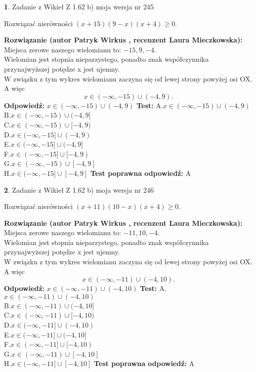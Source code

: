 \documentclass[12pt, a4paper]{article}
\theoremstyle{definition} %
\newtheorem{zad}{}
\newcommand{\zadStart}[1]{\begin{zad}#1\newline}
\newcommand{\zadStop}{\end{zad}}
\newcommand{\rozwStart}[2]{\noindent \textbf{Rozwiązanie (autor #1 , recenzent #2): }\newline}
\newcommand{\rozwStop}{\newline}
\newcommand{\odpStart}{\noindent \textbf{Odpowiedź:}\newline}
\newcommand{\odpStop}{\newline}
\newcommand{\testStart}{\noindent \textbf{Test:}\newline}
\newcommand{\testStop}{\newline}
\newcommand{\kluczStart}{\noindent \textbf{Test poprawna odpowiedź:}\newline}
\newcommand{\kluczStop}{\newline}
\begin{document}
\zadStart{Zadanie z Wikieł Z 1.62 b) moja wersja nr 245}

Rozwiązać nierówności $(x+15)(9-x)(x+4)\ge0$.
\zadStop
\rozwStart{Patryk Wirkus}{Laura Mieczkowska}
Miejsca zerowe naszego wielomianu to: $-15, 9, -4$.\\
Wielomian jest stopnia nieparzystego, ponadto znak współczynnika przy\linebreak najwyższej potędze x jest ujemny.\\ W związku z tym wykres wielomianu zaczyna się od lewej strony powyżej osi OX. A więc $$x \in (-\infty,-15) \cup (-4,9).$$
\rozwStop
\odpStart
$x \in (-\infty,-15) \cup (-4,9)$
\odpStop
\testStart
A.$x \in (-\infty,-15) \cup (-4,9)$\\
B.$x \in (-\infty,-15) \cup (-4,9]$\\
C.$x \in (-\infty,-15) \cup [-4,9)$\\
D.$x \in (-\infty,-15] \cup (-4,9)$\\
E.$x \in (-\infty,-15] \cup (-4,9]$\\
F.$x \in (-\infty,-15] \cup [-4,9)$\\
G.$x \in (-\infty,-15) \cup [-4,9]$\\
H.$x \in (-\infty,-15] \cup [-4,9]$
\testStop
\kluczStart
A
\kluczStop



\zadStart{Zadanie z Wikieł Z 1.62 b) moja wersja nr 246}

Rozwiązać nierówności $(x+11)(10-x)(x+4)\ge0$.
\zadStop
\rozwStart{Patryk Wirkus}{Laura Mieczkowska}
Miejsca zerowe naszego wielomianu to: $-11, 10, -4$.\\
Wielomian jest stopnia nieparzystego, ponadto znak współczynnika przy\linebreak najwyższej potędze x jest ujemny.\\ W związku z tym wykres wielomianu zaczyna się od lewej strony powyżej osi OX. A więc $$x \in (-\infty,-11) \cup (-4,10).$$
\rozwStop
\odpStart
$x \in (-\infty,-11) \cup (-4,10)$
\odpStop
\testStart
A.$x \in (-\infty,-11) \cup (-4,10)$\\
B.$x \in (-\infty,-11) \cup (-4,10]$\\
C.$x \in (-\infty,-11) \cup [-4,10)$\\
D.$x \in (-\infty,-11] \cup (-4,10)$\\
E.$x \in (-\infty,-11] \cup (-4,10]$\\
F.$x \in (-\infty,-11] \cup [-4,10)$\\
G.$x \in (-\infty,-11) \cup [-4,10]$\\
H.$x \in (-\infty,-11] \cup [-4,10]$
\testStop
\kluczStart
A
\kluczStop
\end{document}
